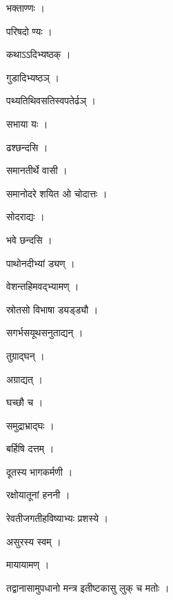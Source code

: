 \documentclass[10pt, openany, oneside]{book}
\begin{document}
\noindent भक्ताण्णः ।

\noindent परिषदो ण्यः ।

\noindent कथाऽऽदिभ्यष्ठक् ।

\noindent गुडादिभ्यष्ठञ् ।

\noindent पथ्यतिथिवसतिस्वपतेर्ढञ् ।

\noindent सभाया यः ।

\noindent ढश्छन्दसि ।

\noindent समानतीर्थे वासी ।

\noindent समानोदरे शयित ओ चोदात्तः ।

\noindent सोदराद्यः ।

\noindent भवे छन्दसि ।

\noindent पाथोनदीभ्यां ड्यण् ।

\noindent वेशन्तहिमवद्भ्यामण् ।

\noindent स्रोतसो विभाषा ड्यड्ड्यौ ।

\noindent सगर्भसयूथसनुताद्यन् ।

\noindent तुग्राद्घन् ।

\noindent अग्राद्यत् ।

\noindent घच्छौ च ।

\noindent समुद्राभ्राद्घः ।

\noindent बर्हिषि दत्तम् ।

\noindent दूतस्य भागकर्मणी ।

\noindent रक्षोयातूनां हननी ।

\noindent रेवतीजगतीहविष्याभ्यः प्रशस्ये ।

\noindent असुरस्य स्वम् ।

\noindent मायायामण् ।

\noindent तद्वानासामुपधानो मन्त्र इतीष्टकासु लुक् च मतोः ।
\end{document}
